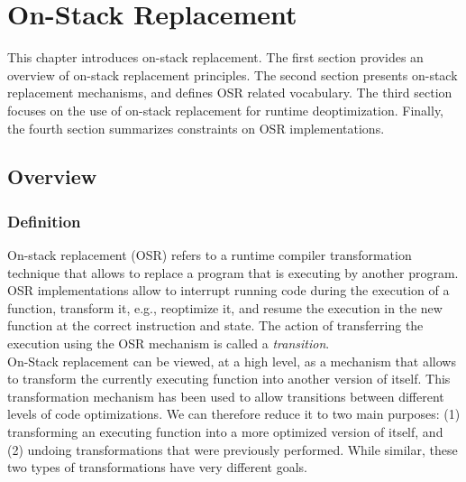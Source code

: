 
\chapter{On-Stack Replacement} %

\label{Chapter2} %


\newcommand{\keyword}[1]{\textbf{#1}}
\newcommand{\tabhead}[1]{\textbf{#1}}
\newcommand{\code}[1]{\texttt{#1}}
\newcommand{\file}[1]{\texttt{\bfseries#1}}
\newcommand{\option}[1]{\texttt{\itshape#1}}

This chapter introduces on-stack replacement.
The first section provides an overview of on-stack replacement principles.
The second section presents on-stack replacement mechanisms, and defines OSR related vocabulary.
The third section focuses on the use of on-stack replacement for runtime deoptimization.
Finally, the fourth section summarizes constraints on OSR implementations.\\

\section{Overview}
\subsection{Definition}

On-stack replacement (OSR) refers to a runtime compiler transformation technique that allows to replace a program that is executing by another program.
OSR implementations allow to interrupt running code during the execution of a function, transform it, e.g., reoptimize it, and resume the execution in the new function at the correct instruction and state.
The action of transferring the execution using the OSR mechanism is called a \textit{transition}.\\

On-Stack replacement can be viewed, at a high level, as a mechanism that allows to transform the currently executing function into another version of itself.
This transformation mechanism has been used to allow transitions between different levels of code optimizations.
We can therefore reduce it to two main purposes: (1) transforming an executing function into a more optimized version of itself, and (2) undoing transformations that were previously performed.
While similar, these two types of transformations have very different goals.\\

